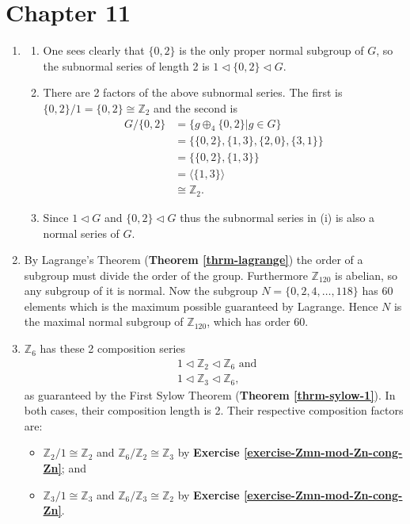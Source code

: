 \section*{Chapter 11}
\begin{enumerate}
    \item \begin{enumerate}[label=(\roman*)]
        \item One sees clearly that $\{0, 2\}$ is the only proper normal subgroup of $G$, so the subnormal series of length 2 is $1 \lhd \{0, 2\} \lhd G$.
        \item There are 2 factors of the above subnormal series. The first is $\{0, 2\} / 1 = \{0, 2\} \cong \mathbb{Z}_2$ and the second is
        \begin{align*}
            G / \{0, 2\} &= \{g \oplus_4 \{0, 2\} \vert g \in G\}\\
            &= \{\{0, 2\}, \{1, 3\}, \{2, 0\}, \{3, 1\}\}\\
            &= \{\{0, 2\}, \{1, 3\}\}\\
            &= \langle \{1, 3\} \rangle\\
            &\cong \mathbb{Z}_2.
        \end{align*}
        \item Since $1 \lhd G$ and $\{0, 2\} \lhd G$ thus the subnormal series in (i) is also a normal series of $G$.
    \end{enumerate}
    
    \item By Lagrange's Theorem (\textbf{Theorem \ref{thrm-lagrange}}) the order of a subgroup must divide the order of the group. Furthermore $\mathbb{Z}_{120}$ is abelian, so any subgroup of it is normal. Now the subgroup $N = \{0, 2, 4, \dots, 118\}$ has 60 elements which is the maximum possible guaranteed by Lagrange. Hence $N$ is the maximal normal subgroup of $\mathbb{Z}_{120}$, which has order 60.
    
    \item $\mathbb{Z}_6$ has these 2 composition series
    \begin{align*}
        &1 \lhd \mathbb{Z}_2 \lhd \mathbb{Z}_6 \text{ and }\\
        &1 \lhd \mathbb{Z}_3 \lhd \mathbb{Z}_6,
    \end{align*}
    as guaranteed by the First Sylow Theorem (\textbf{Theorem \ref{thrm-sylow-1}}). In both cases, their composition length is 2. Their respective composition factors are:
    \begin{itemize}
        \item $\mathbb{Z}_2 / 1 \cong \mathbb{Z}_2$ and $\mathbb{Z}_6 / \mathbb{Z}_2 \cong \mathbb{Z}_3$ by \textbf{Exercise \ref{exercise-Zmn-mod-Zn-cong-Zn}}; and
        \item $\mathbb{Z}_3 / 1 \cong \mathbb{Z}_3$ and $\mathbb{Z}_6 / \mathbb{Z}_3 \cong \mathbb{Z}_2$ by \textbf{Exercise \ref{exercise-Zmn-mod-Zn-cong-Zn}}.
    \end{itemize}
    

\end{enumerate}
